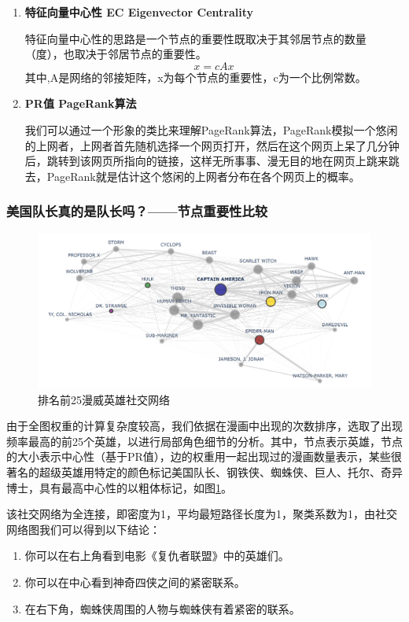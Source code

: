 \documentclass[12pt]{xjtureport}
\begin{document}
\begin{enumerate}
    \item \textbf{特征向量中心性 EC Eigenvector Centrality}
    
    特征向量中心性的思路是一个节点的重要性既取决于其邻居节点的数量（度），也取决于邻居节点的重要性。
    $$x = cAx$$
    其中,A是网络的邻接矩阵，x为每个节点的重要性，c为一个比例常数。


    \item \textbf{PR值 PageRank算法}
    
    我们可以通过一个形象的类比来理解PageRank算法，PageRank模拟一个悠闲的上网者，上网者首先随机选择一个网页打开，然后在这个网页上呆了几分钟后，跳转到该网页所指向的链接，这样无所事事、漫无目的地在网页上跳来跳去，PageRank就是估计这个悠闲的上网者分布在各个网页上的概率。
\end{enumerate}

\subsubsection{美国队长真的是队长吗？——节点重要性比较}

\begin{figure}[!htbp]
    \centering
    \includegraphics[width=\linewidth]{figures/top 25 Heroes Network.png}
    \caption{排名前25漫威英雄社交网络}
    \label{T25}
\end{figure}

由于全图权重的计算复杂度较高，我们依据在漫画中出现的次数排序，选取了出现频率最高的前25个英雄，以进行局部角色细节的分析。其中，节点表示英雄，节点的大小表示中心性（基于PR值），边的权重用一起出现过的漫画数量表示，某些很著名的超级英雄用特定的颜色标记美国队长、钢铁侠、蜘蛛侠、巨人、托尔、奇异博士，具有最高中心性的以粗体标记，如图\ref{T25}。

该社交网络为全连接，即密度为1，平均最短路径长度为1，聚类系数为1，由社交网络图我们可以得到以下结论：

\begin{enumerate}
    \item 你可以在右上角看到电影《复仇者联盟》中的英雄们。

    \item 你可以在中心看到神奇四侠之间的紧密联系。

    \item 在右下角，蜘蛛侠周围的人物与蜘蛛侠有着紧密的联系。
\end{enumerate}
\end{document}
